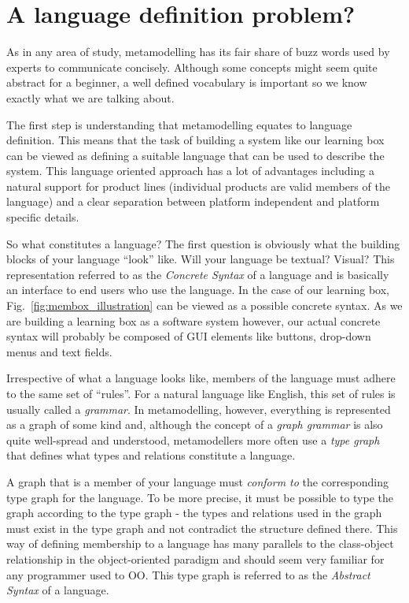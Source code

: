 
\section{A language definition problem?}

As in any area of study, metamodelling has its fair share of buzz words used by experts to communicate concisely.  Although some concepts might seem quite abstract for a beginner, a well defined vocabulary is important so we know
exactly what we are talking about.

The first step is understanding that metamodelling equates to language definition.
This means that the task of building a system like our learning box can be viewed as defining a suitable language that can be used to describe the system.
This language oriented approach has a lot of advantages including a natural support for product lines (individual products are valid members of the language) and a clear separation between platform independent and platform specific details.

So what constitutes a language?  The first question is obviously what the building blocks of your language ``look'' like.
Will your language be textual?  Visual?  This representation referred to as the \emph{Concrete Syntax} of a language and is basically an interface to end users who use the language. In the case of our learning box, Fig.~\ref{fig:membox_illustration} can be viewed as a possible concrete syntax.
As we are building a learning box as a software system however, our actual concrete syntax  will probably be composed of GUI elements like buttons, drop-down menus and text fields.

Irrespective of what a language looks like, members of the language must adhere to the same set of ``rules''.
For a natural language like English, this set of rules is usually called a \emph{grammar}.
In metamodelling, however, everything is represented as a graph of some kind and, although the concept of a  \emph{graph grammar} is also quite well-spread and understood, metamodellers  more often use a \emph{type graph} that defines what types and relations  constitute a language.

A graph that is a member of your language must \emph{conform to} the corresponding type graph for the language.
To be more precise, it must be possible to type the graph according to the type graph - the types and relations used in the graph must exist in the type graph and not contradict the structure defined there.
This way of defining membership to a language has many parallels to the class-object relationship in the object-oriented paradigm and should seem very familiar for any programmer used to OO.
This type graph is referred to as the \emph{Abstract Syntax} of a language.

